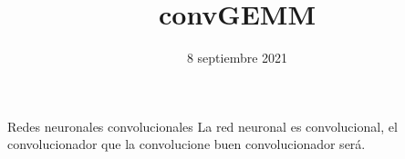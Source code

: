 \documentclass[aspectratio=43]{beamer}
\begin{document}
\title{convGEMM}

% 

\date{8 septiembre 2021}

\begin{frame}%
\titlepage
\end{frame}


\begin{frame}{Redes neuronales convolucionales}
La red neuronal es convolucional, el convolucionador que la convolucione buen convolucionador será.
\end{frame}
\end{document}
